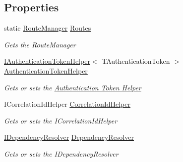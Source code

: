 \subsection*{Properties}
\begin{DoxyCompactItemize}
\item 
static \hyperlink{classCqrs_1_1Bus_1_1RouteManager}{Route\+Manager} \hyperlink{classCqrs_1_1Akka_1_1Commands_1_1AkkaCommandBus_a93ddefb347d0cbc4f869c6d0866c8c64_a93ddefb347d0cbc4f869c6d0866c8c64}{Routes}
\begin{DoxyCompactList}\small\item\em Gets the Route\+Manager \end{DoxyCompactList}\item 
\hyperlink{interfaceCqrs_1_1Authentication_1_1IAuthenticationTokenHelper}{I\+Authentication\+Token\+Helper}$<$ T\+Authentication\+Token $>$ \hyperlink{classCqrs_1_1Akka_1_1Commands_1_1AkkaCommandBus_ad74a628484d215ec6daab02b20ac1dbe_ad74a628484d215ec6daab02b20ac1dbe}{Authentication\+Token\+Helper}
\begin{DoxyCompactList}\small\item\em Gets or sets the \hyperlink{}{Authentication Token Helper} \end{DoxyCompactList}\item 
I\+Correlation\+Id\+Helper \hyperlink{classCqrs_1_1Akka_1_1Commands_1_1AkkaCommandBus_ad8bdf5674c0d5ea3fd9340bd8cd4b0a8_ad8bdf5674c0d5ea3fd9340bd8cd4b0a8}{Correlation\+Id\+Helper}
\begin{DoxyCompactList}\small\item\em Gets or sets the I\+Correlation\+Id\+Helper \end{DoxyCompactList}\item 
\hyperlink{interfaceCqrs_1_1Configuration_1_1IDependencyResolver}{I\+Dependency\+Resolver} \hyperlink{classCqrs_1_1Akka_1_1Commands_1_1AkkaCommandBus_ae1229644077b0740d9014708d15b44c2_ae1229644077b0740d9014708d15b44c2}{Dependency\+Resolver}
\begin{DoxyCompactList}\small\item\em Gets or sets the I\+Dependency\+Resolver \end{DoxyCompactList}\item 

\end{DoxyCompactItemize}
